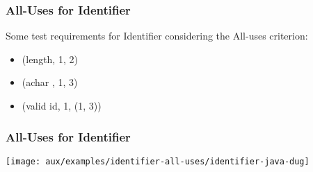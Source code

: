\begin{frame}[hasprev=false,hasnext=true]
\label{example:identifier-all-uses}
\frametitle{All-Uses for Identifier}

Some test requirements for Identifier considering the All-uses criterion:
\begin{itemize}
	\item (length, 1, 2)
	\item (achar , 1, 3)
	\item (valid id, 1, (1, 3))
\end{itemize}

\end{frame}

\begin{frame}[c, hasprev=true, hasnext=false]
\frametitle{All-Uses for Identifier}

\texttt{[image: aux/examples/identifier-all-uses/identifier-java-dug]}
\end{frame}